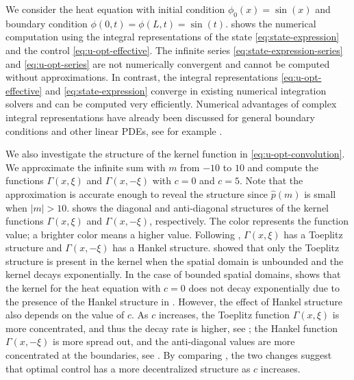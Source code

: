\documentclass[journal,twoside,web]{ieeecolor}
\newcommand{\state}{\phi}
\newcommand{\abs}[1]{\left|#1\right|}
\begin{document}
We consider the heat equation with initial condition $\state_0(x)=\sin(x)$ and boundary condition $\state(0,t) = \state(L,t) = \sin(t)$.
 shows the numerical computation using the integral representations of the state \eqref{eq:state-expression} and the control \eqref{eq:u-opt-effective}.
The infinite series \eqref{eq:state-expression-series} and \eqref{eq:u-opt-series} are not numerically convergent and cannot be computed without approximations.
In contrast, the integral representations  \eqref{eq:u-opt-effective} and \eqref{eq:state-expression} converge in existing numerical integration solvers and can be computed very efficiently. 
Numerical advantages of complex integral representations have already been discussed for general boundary conditions and other linear PDEs, see for example \cite{de2019hybrid}.



We also investigate the structure of the kernel function in \eqref{eq:u-opt-convolution}. We approximate the infinite sum with $m$ from $-10$ to $10$ and compute the functions $\Gamma(x,\xi)$ and $\Gamma(x,-\xi)$ with $c=0$ and $c=5$. Note that the approximation is accurate enough to reveal the structure since $\hat{p}(m)$ is small when $\abs{m}>10$.  shows the diagonal and anti-diagonal structures of the kernel functions $\Gamma(x,\xi)$ and $\Gamma(x,-\xi)$, respectively.
The color represents the function value; a brighter color means a higher value.
 Following , $\Gamma(x,\xi)$ has a Toeplitz structure and $\Gamma(x,-\xi)$ has a Hankel structure. \cite{bamieh2002distributed} showed that only the Toeplitz structure is present in the kernel when the spatial domain is unbounded and the kernel decays exponentially. In the case of bounded spatial domains,  shows that the kernel for the heat equation with $c=0$ does not decay exponentially due to the presence of the Hankel structure in .
 However, the effect of Hankel structure also depends on the value of $c$. As $c$ increases, the Toeplitz function $\Gamma(x,\xi)$ is more concentrated, and thus the decay rate is higher, see ; the Hankel function $\Gamma(x,-\xi)$ is more spread out, and the anti-diagonal values are more concentrated at the boundaries, see . 
 By comparing , the two changes suggest that optimal control has a more decentralized structure as $c$ increases.
\end{document}
